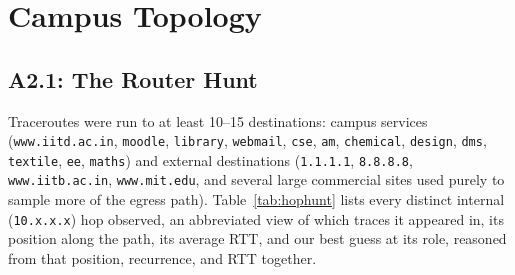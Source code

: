 \chapter{Campus Topology}\label{ch:Design}

\section{A2.1: The Router Hunt}
Traceroutes were run to at least 10--15 destinations: campus services
(\texttt{www.iitd.ac.in}, \texttt{moodle}, \texttt{library}, \texttt{webmail},
\texttt{cse}, \texttt{am}, \texttt{chemical}, \texttt{design}, \texttt{dms}, \texttt{textile},
\texttt{ee}, \texttt{maths}) and external destinations (\texttt{1.1.1.1}, \texttt{8.8.8.8},
\texttt{www.iitb.ac.in}, \texttt{www.mit.edu}, and several large commercial sites used purely
to sample more of the egress path). Table~\ref{tab:hophunt} lists every distinct internal
(\texttt{10.x.x.x}) hop observed, an abbreviated view of which traces it appeared in, its
position along the path, its average RTT, and our best guess at its role, reasoned from that
position, recurrence, and RTT together.

